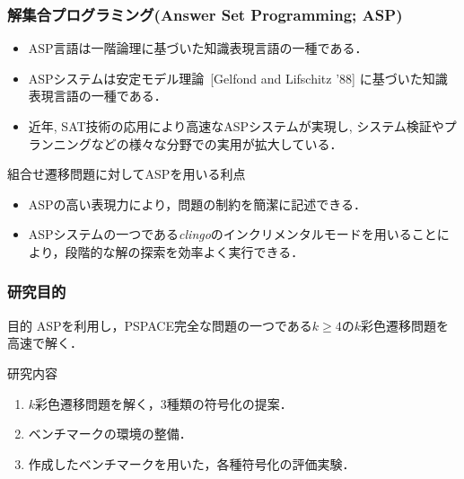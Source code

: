 \documentclass[dvipdfmx,11pt]{beamer}
\begin{document}
\begin{frame}\frametitle{解集合プログラミング(Answer Set Programming; ASP)}

  \begin{itemize}
    \item ASP言語は一階論理に基づいた知識表現言語の一種である．
    \item ASPシステムは安定モデル理論~[Gelfond and Lifschitz '88] に基づいた知識表現言語の一種である．
    \item 近年, SAT技術の応用により高速なASPシステムが実現し, システム検証やプランニングなどの様々な分野での実用が拡大している．
  \end{itemize}

  \begin{alertblock}{組合せ遷移問題に対してASPを用いる利点}
    \begin{itemize}
      \item ASPの高い表現力により，問題の制約を簡潔に記述できる．
      \item ASPシステムの一つである\textit{clingo}のインクリメンタルモードを用いることにより，段階的な解の探索を効率よく実行できる．
    \end{itemize}
  \end{alertblock}
  
\end{frame}


\begin{frame}\frametitle{研究目的}
  \begin{alertblock}{目的}
    ASPを利用し，PSPACE完全な問題の一つである$k \ge 4$の$k$彩色遷移問題を高速で解く．%
  \end{alertblock}

  \begin{block}{研究内容}
    \begin{enumerate}
      \item $k$彩色遷移問題を解く，3種類の符号化の提案．
      \item ベンチマークの環境の整備．
      \item 作成したベンチマークを用いた，各種符号化の評価実験．
    \end{enumerate}
  \end{block}

\end{frame}

\end{document}
